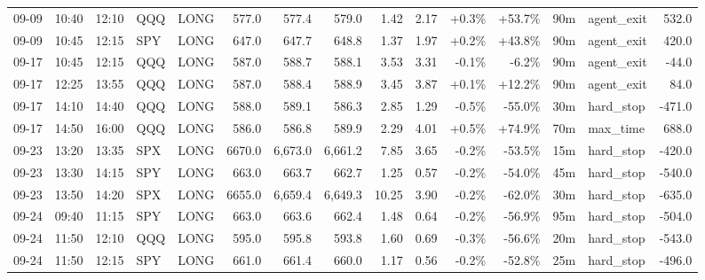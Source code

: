 \documentclass[11pt,a4paper,twoside]{article}
\begin{document}
\begin{landscape}
\begin{center}
\begin{longtable}{>{\color{txtmain}}l l l l l r r r r r r r r >{\color{txtmain}}l r}
09-09 & 10:40 & 12:10 & QQQ & LONG & 577.0 & 577.4 & 579.0 & 1.42 & 2.17 & \textcolor{wingreen}{+0.3\%} & \textcolor{wingreen}{+53.7\%} & 90m & agent\_exit & \textcolor{wingreen}{532.0} \\
09-09 & 10:45 & 12:15 & SPY & LONG & 647.0 & 647.7 & 648.8 & 1.37 & 1.97 & \textcolor{wingreen}{+0.2\%} & \textcolor{wingreen}{+43.8\%} & 90m & agent\_exit & \textcolor{wingreen}{420.0} \\
09-17 & 10:45 & 12:15 & QQQ & LONG & 587.0 & 588.7 & 588.1 & 3.53 & 3.31 & \textcolor{lossred}{-0.1\%} & \textcolor{lossred}{-6.2\%} & 90m & agent\_exit & \textcolor{lossred}{-44.0} \\
09-17 & 12:25 & 13:55 & QQQ & LONG & 587.0 & 588.4 & 588.9 & 3.45 & 3.87 & \textcolor{wingreen}{+0.1\%} & \textcolor{wingreen}{+12.2\%} & 90m & agent\_exit & \textcolor{wingreen}{84.0} \\
09-17 & 14:10 & 14:40 & QQQ & LONG & 588.0 & 589.1 & 586.3 & 2.85 & 1.29 & \textcolor{lossred}{-0.5\%} & \textcolor{lossred}{-55.0\%} & 30m & hard\_stop & \textcolor{lossred}{-471.0} \\
09-17 & 14:50 & 16:00 & QQQ & LONG & 586.0 & 586.8 & 589.9 & 2.29 & 4.01 & \textcolor{wingreen}{+0.5\%} & \textcolor{wingreen}{+74.9\%} & 70m & max\_time & \textcolor{wingreen}{688.0} \\
09-23 & 13:20 & 13:35 & SPX & LONG & 6670.0 & 6,673.0 & 6,661.2 & 7.85 & 3.65 & \textcolor{lossred}{-0.2\%} & \textcolor{lossred}{-53.5\%} & 15m & hard\_stop & \textcolor{lossred}{-420.0} \\
09-23 & 13:30 & 14:15 & SPY & LONG & 663.0 & 663.7 & 662.7 & 1.25 & 0.57 & \textcolor{lossred}{-0.2\%} & \textcolor{lossred}{-54.0\%} & 45m & hard\_stop & \textcolor{lossred}{-540.0} \\
09-23 & 13:50 & 14:20 & SPX & LONG & 6655.0 & 6,659.4 & 6,649.3 & 10.25 & 3.90 & \textcolor{lossred}{-0.2\%} & \textcolor{lossred}{-62.0\%} & 30m & hard\_stop & \textcolor{lossred}{-635.0} \\
09-24 & 09:40 & 11:15 & SPY & LONG & 663.0 & 663.6 & 662.4 & 1.48 & 0.64 & \textcolor{lossred}{-0.2\%} & \textcolor{lossred}{-56.9\%} & 95m & hard\_stop & \textcolor{lossred}{-504.0} \\
09-24 & 11:50 & 12:10 & QQQ & LONG & 595.0 & 595.8 & 593.8 & 1.60 & 0.69 & \textcolor{lossred}{-0.3\%} & \textcolor{lossred}{-56.6\%} & 20m & hard\_stop & \textcolor{lossred}{-543.0} \\
09-24 & 11:50 & 12:15 & SPY & LONG & 661.0 & 661.4 & 660.0 & 1.17 & 0.56 & \textcolor{lossred}{-0.2\%} & \textcolor{lossred}{-52.8\%} & 25m & hard\_stop & \textcolor{lossred}{-496.0} \\

\end{longtable}
\end{center}
\end{landscape}
\end{document}
